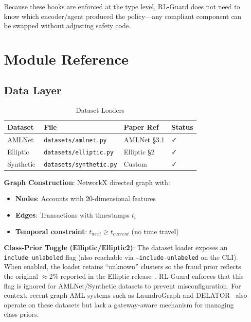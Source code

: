 \documentclass[11pt,a4paper]{article}
\begin{document}
Because these hooks are enforced at the type level, RL-Guard does not need to know which encoder/agent produced the policy---any compliant component can be swapped without adjusting safety code.
\section{Module Reference}

\subsection{Data Layer}

\begin{table}[htbp]
\centering
\caption{Dataset Loaders}
\label{tab:datasets}
\begin{tabular}{@{}llll@{}}
\toprule
\textbf{Dataset} & \textbf{File} & \textbf{Paper Ref} & \textbf{Status} \\
\midrule
AMLNet~\cite{amlnet2024} & \texttt{datasets/amlnet.py} & AMLNet §3.1 & ✓ \\
Elliptic~\cite{elliptic2019} & \texttt{datasets/elliptic.py} & Elliptic §2 & ✓ \\
Synthetic & \texttt{datasets/synthetic.py} & Custom & ✓ \\
\bottomrule
\end{tabular}
\end{table}

\textbf{Graph Construction}: NetworkX directed graph with:
\begin{itemize}
    \item \textbf{Nodes}: Accounts with 20-dimensional features
    \item \textbf{Edges}: Transactions with timestamps $t_i$
    \item \textbf{Temporal constraint}: $t_{next} \geq t_{current}$ (no time travel)
\end{itemize}

\textbf{Class-Prior Toggle (Elliptic/Elliptic2)}: The dataset loader exposes an \texttt{include\_unlabeled} flag (also reachable via \texttt{--include-unlabeled} on the CLI). When enabled, the loader retains ``unknown'' clusters so the fraud prior reflects the original $\approx$2\% reported in the Elliptic release~\cite{elliptic2019}. RL-Guard enforces that this flag is ignored for AMLNet/Synthetic datasets to prevent misconfiguration. For context, recent graph-AML systems such as LaundroGraph and DELATOR~\cite{cardoso2022laundrograph,assumpcao2022delator} also operate on these datasets but lack a gateway-aware mechanism for managing class priors.
\end{document}
